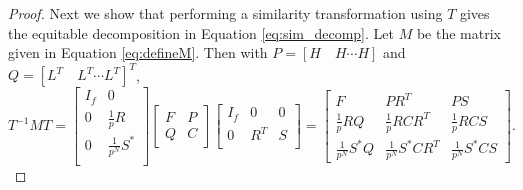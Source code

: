 \documentclass[preprint,12pt]{elsarticle}
\theoremstyle{definition}
\theoremstyle{remark}
\begin{document}
\begin{proof}
Next we show that performing a similarity transformation using $T$ gives the equitable decomposition in Equation \ref{eq:sim_decomp}.
Let $M$ be the matrix given in Equation \ref{eq:defineM}.  Then with $P = \left[ H \quad H \cdots H\right]$ and
$Q = [ L^T \quad L^T \cdots L^T]^T$,
\[
T^{-1}MT = \left[\begin{array}{cc  }
I_f & 0 \\[1mm]
0 & \frac{1}{p}R \\[1mm]
 0 & \frac{1}{p^N}S^*   \\
\end{array}\right]
\left[\begin{array}{rr} F & P \\ Q & C \end{array}\right]
 \left[\begin{array}{ccc}
I_f & 0 & 0 \\
 0& R^T & S \\
\end{array}\right] 
=\left[\begin{array}{ccc} 
F & PR^T & PS \\[1mm]
\frac{1}{p}RQ  & \frac{1}{p}RCR^T & \frac{1}{p}RCS\\[1mm]
 \frac{1}{p^N}S^*Q & \frac{1}{p^N} S^*CR^T & \frac{1}{p^N}S^*CS \end{array}\right].\label{blocks}
\]

\end{proof}
\end{document}
